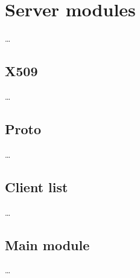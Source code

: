 \section{Server modules}\label{sec:servermod}

\ldots

\subsection{X509}\label{subsec:serverx509mod}

\ldots

\subsection{Proto}\label{subsec:serverprotomod}

\ldots

\subsection{Client list}\label{subsec:clientlistmod}

\ldots

\subsection{Main module}\label{subsec:servermainmod}

\ldots
